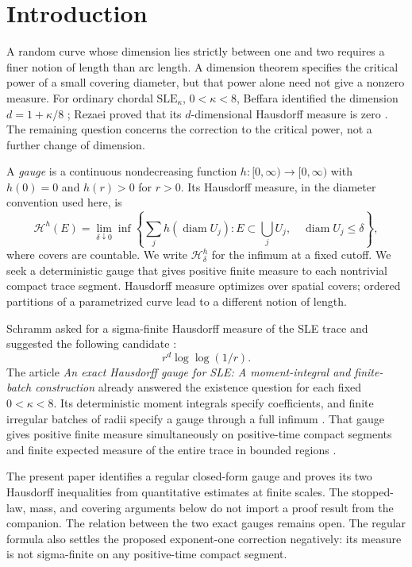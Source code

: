 \section{Introduction}\label{sec:introduction}

A random curve whose dimension lies strictly between one and two
requires a finer notion of length than arc length. A dimension theorem
specifies the critical power of a small covering diameter, but that
power alone need not give a nonzero measure. For ordinary chordal
$\mathrm{SLE}_\kappa$, $0<\kappa<8$, Beffara identified the dimension
$d=1+\kappa/8$ \cite[main Theorem]{beffara2008}; Rezaei proved that its
$d$-dimensional Hausdorff measure is zero
\cite[Theorem~1.1]{rezaei2018}. The remaining question concerns the
correction to the critical power, not a further change of dimension.

A \emph{gauge} is a continuous nondecreasing function
$h:[0,\infty)\to[0,\infty)$ with $h(0)=0$ and $h(r)>0$ for $r>0$.
Its Hausdorff measure,
in the diameter convention used here, is
\begin{equation}\label{eq:hausdorff-definition}
 \mathcal H^h(E)=\lim_{\delta\downarrow0}\inf\left\{
 \sum_j h(\operatorname{diam}U_j):
 E\subset\bigcup_jU_j,\quad \operatorname{diam}U_j\le\delta\right\},
\end{equation}
where covers are countable. We write $\mathcal H^h_\delta$ for the
infimum at a fixed cutoff. We seek a deterministic gauge that gives
positive finite measure to each nontrivial compact trace segment.
Hausdorff measure optimizes over spatial covers; ordered partitions
of a parametrized curve lead to a different notion of length.

Schramm asked for a sigma-finite Hausdorff measure of the SLE trace
and suggested the following candidate
\cite[Problem~7.1 and the following discussion]{schramm2007}:
\[
 r^d\log\log(1/r).
\]
The article \emph{An exact Hausdorff gauge for SLE: A moment-integral
and finite-batch construction} already answered the existence question
for each fixed $0<\kappa<8$. Its deterministic moment integrals specify
coefficients, and finite irregular batches of radii specify a gauge
through a full infimum \cite[equations~(5.8) and~(6.4)]{openai2026exact}.
That gauge gives positive finite measure simultaneously on positive-time
compact segments and finite expected measure of the entire trace in
bounded regions \cite[Theorem~1.1 and Proposition~8.2]{openai2026exact}.

The present paper identifies a regular closed-form gauge and proves
its two Hausdorff inequalities from quantitative estimates at finite
scales. The stopped-law, mass, and covering arguments below do not
import a proof result from the companion. The relation between the
two exact gauges remains open.
The regular formula also settles the proposed exponent-one correction
negatively: its measure is not sigma-finite on any positive-time
compact segment.

